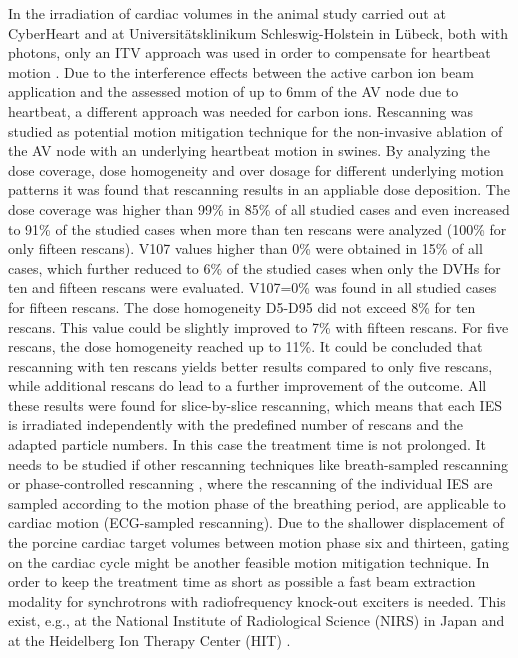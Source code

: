 \documentclass[type=dr, dr=rernat, accentcolor=tud7b,colorbacktitle, bigchapter, openright, twoside, 12pt ]{tudthesis}
\begin{document}
In the irradiation of cardiac volumes in the animal study carried out at CyberHeart and at Universit\"atsklinikum 
Schleswig-Holstein in L\"ubeck, both with photons, only an ITV approach was used in order to compensate for heartbeat motion \cite{Sha10} \cite{Bla13}. 
Due to the interference effects between the active carbon ion beam application and the assessed motion of up to 6mm of the AV node due to heartbeat, 
a different approach was needed for carbon ions. Rescanning was studied as potential motion mitigation technique for the non-invasive 
ablation of the AV node with an underlying heartbeat motion in swines.\newline
\newline
By analyzing the dose coverage, dose homogeneity and over dosage for different underlying motion patterns it was found that rescanning results 
in an appliable dose deposition. The dose coverage was higher than 99\% in 85\% of all studied cases 
and even increased to 91\% of the studied cases when more than ten rescans were analyzed (100\% for only fifteen rescans). V107 values 
higher than 0\% were obtained in 15\% of all cases, which further reduced to 6\% of the studied cases when only the DVHs for ten and fifteen 
rescans were evaluated. V107=0\% was found in all studied cases for fifteen rescans. The dose homogeneity D5-D95 did not exceed 8\% for ten 
rescans. This value could be slightly improved to 7\% with fifteen rescans. For five rescans, the dose homogeneity reached up to 11\%.
It could be concluded that rescanning with ten rescans yields better results compared to only five rescans, while 
additional rescans do lead to a further improvement of the outcome.\newline
\newline
All these results were found for slice-by-slice rescanning, which means that each IES is irradiated independently with the predefined number 
of rescans and the adapted particle numbers. In this case the treatment time is not prolonged. It needs to be studied if other rescanning 
techniques like breath-sampled rescanning \cite{Sec09} or phase-controlled rescanning \cite{Fur07}, where the rescanning of the individual IES 
are sampled according to the motion phase of the breathing period, are applicable to cardiac motion (ECG-sampled rescanning). Due to the 
shallower displacement of the porcine cardiac target volumes between motion phase six and thirteen, gating \cite{Kub96} on the cardiac cycle 
might be another feasible motion mitigation technique. In order to keep the treatment time as short as possible a fast beam extraction 
modality for synchrotrons with radiofrequency knock-out exciters is needed. This exist, e.g., at the National Institute of Radiological 
Science (NIRS) in Japan \cite{Nod96} \cite{Fur05} and at the Heidelberg Ion Therapy Center (HIT) \cite{Sch11}. 
\end{document}
